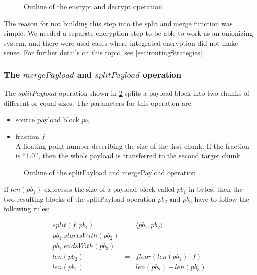 \begin{figure}[ht]\centering
	\resizebox{0.35\textwidth}{!}{}
	\resizebox{0.35\textwidth}{!}{}
	\caption{Outline of the encrypt and decrypt operation}
	\label{fig:encryptOperation}
\end{figure}

The reason for not building this step into the split and merge function was simple. We needed a separate encryption step to be able to work as an onionizing system, and there were used cases where integrated encryption did not make sense. For further details on this topic, see \cref{sec:routingStrategies}.


\subsubsection{The \texorpdfstring{$mergePayload$ and $splitPayload$}{mergePayload and splitPayload} operation}\label{sec:mergeAndSplit}
The $splitPayload$ operation shown in \cref{fig:mergeOperation} splits a payload block into two chunks of different or equal sizes. The parameters for this operation are:

\begin{itemize}
	\item source payload block $pb_1$
	\item fraction $f$\\
	A floating-point number describing the size of the first chunk. If the fraction is ``1.0'', then the whole payload is transferred to the second target chunk.
\end{itemize}

\begin{figure}[ht]\centering
	\resizebox{0.43\textwidth}{!}{}
	\resizebox{0.35\textwidth}{!}{}
	\caption{Outline of the splitPayload and mergePayload operation}
	\label{fig:mergeOperation}
\end{figure}
If $len(pb_1)$ expresses the size of a payload block called $pb_1$ in bytes, then the two resulting blocks of the splitPayload operation $pb_2$ and $pb_3$ have to follow the following rules:

\begin{eqnarray}
	split(f, pb_1) & = &\langle pb_1, pb_2 \rangle\\
	pb_1.startsWith(pb_2)\\
	pb_1.endsWith(pb_3)\\
	len(pb_2) & = & floor(len(pb_1)\cdot f)\\
	len(pb_1) & = & len(pb_2) + len(pb_3)
\end{eqnarray}

